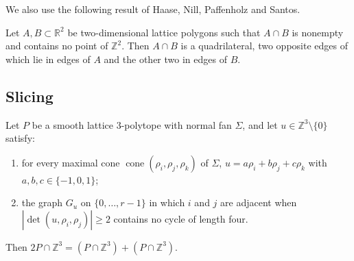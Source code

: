 \documentclass[12pt]{article}
\newcommand{\R}{\mathbb{R}}
\newcommand{\Z}{\mathbb{Z}}
\newcommand{\cone}{\operatorname{cone}}
\begin{document}
We also use the following result of Haase, Nill, Paffenholz and Santos.

\begin{lemma}\label{lem:hnps}
Let $A,B\subset\R^2$ be two-dimensional lattice polygons such that $A\cap B$ is nonempty and contains no point of $\Z^2$. Then $A\cap B$ is a quadrilateral, two opposite edges of which lie in edges of $A$ and the other two in edges of $B$.
\end{lemma}

\subsection*{Slicing}

\begin{proposition}\label{prop:slice}
Let $P$ be a smooth lattice $3$-polytope with normal fan $\Sigma$, and let $u\in\Z^3\setminus\{0\}$ satisfy:
\begin{enumerate}
\item[(S1)] for every maximal cone $\cone(\rho_i,\rho_j,\rho_k)$ of $\Sigma$, $u=a\rho_i+b\rho_j+c\rho_k$ with $a,b,c\in\{-1,0,1\}$;
\item[(S2)] the graph $G_u$ on $\{0,\dots,r-1\}$ in which $i$ and $j$ are adjacent when $|\det(u,\rho_i,\rho_j)|\ge2$ contains no cycle of length four.
\end{enumerate}
Then $2P\cap\Z^3=(P\cap\Z^3)+(P\cap\Z^3)$.
\end{proposition}
\end{document}

